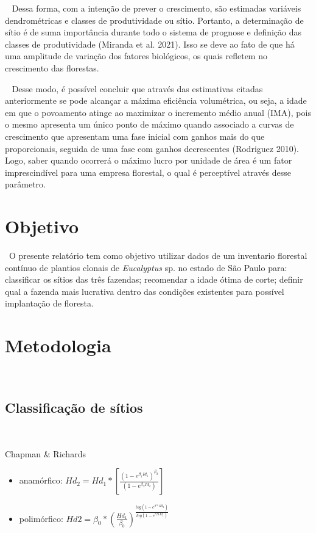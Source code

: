 \documentclass[
  letterpaper,
  DIV=11,
  numbers=noendperiod]{scrartcl}
\begin{document}
~ Dessa forma, com a intenção de prever o crescimento, são estimadas
variáveis dendrométricas e classes de produtividade ou sítio. Portanto,
a determinação de sítio é de suma importância durante todo o sistema de
prognose e definição das classes de produtividade (Miranda et al. 2021).
Isso se deve ao fato de que há uma amplitude de variação dos fatores
biológicos, os quais refletem no crescimento das florestas.

~ Desse modo, é possível concluir que através das estimativas citadas
anteriormente se pode alcançar a máxima eficiência volumétrica, ou seja,
a idade em que o povoamento atinge ao maximizar o incremento médio anual
(IMA), pois o mesmo apresenta um único ponto de máximo quando associado
a curvas de crescimento que apresentam uma fase inicial com ganhos mais
do que proporcionais, seguida de uma fase com ganhos decrescentes
(Rodriguez 2010). Logo, saber quando ocorrerá o máximo lucro por unidade
de área é um fator imprescindível para uma empresa florestal, o qual é
perceptível através desse parâmetro.

\hypertarget{objetivo}{%
\section{Objetivo}\label{objetivo}}

~O presente relatório tem como objetivo utilizar dados de um inventario
florestal contínuo de plantios clonais de \emph{Eucalyptus} sp. no
estado de São Paulo para: classificar os sítios das três fazendas;
recomendar a idade ótima de corte; definir qual a fazenda mais lucrativa
dentro das condições existentes para possível implantação de floresta.

\hypertarget{metodologia}{%
\section{Metodologia}\label{metodologia}}

~

\hypertarget{classificauxe7uxe3o-de-suxedtios}{%
\subsection{Classificação de
sítios}\label{classificauxe7uxe3o-de-suxedtios}}

~

Chapman \& Richards

\begin{itemize}
\item
  anamórfico:
  \(Hd_2 = H d_1 * \left[\frac{ ( 1 - e ^ {\beta_1Id_1} ) ^ { \beta_2} } { ( 1 - e ^ {\beta_2Id_2} ) } \right]\)
\item
  polimórfico:
  \(Hd2 = \beta_0 * \left( \frac{ Hd_1 } {\beta_0} \right) ^{\frac{ log( 1 - e ^ {\beta*1Id_2 } ) } {log( 1 - e ^ {*\beta 1Id_1} ) } }\)
\end{itemize}
\end{document}
